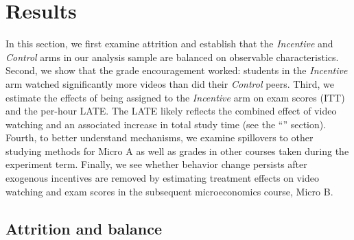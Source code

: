 
\section{Results} \label{sec:results}

In this section, we first examine attrition and establish that the \textit{Incentive} and \textit{Control} arms in our analysis sample are balanced on observable characteristics.
Second, we show that the grade encouragement worked: students in the \textit{Incentive} arm watched significantly more videos than did their \textit{Control} peers.
Third, we estimate the effects of being assigned to the \textit{Incentive} arm on exam scores (ITT) and the per-hour LATE.
The LATE likely reflects the combined effect of video watching and an associated increase in total study time (see the ``'' section).
Fourth, to better understand mechanisms, we examine spillovers to other studying methods for Micro A as well as grades in other courses taken during the experiment term.
Finally, we see whether behavior change persists after exogenous incentives are removed by estimating treatment effects on video watching and exam scores in the subsequent microeconomics course, Micro B.

\subsection{Attrition and balance} \label{subsec:attrition}

